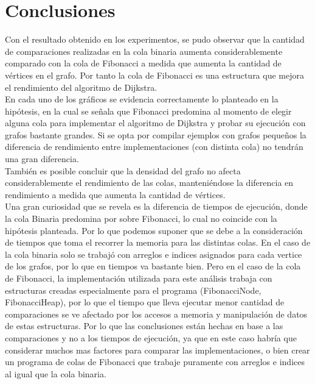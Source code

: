\documentclass[11pt]{article}
\begin{document}


\newpage
\section{Conclusiones}

Con el resultado obtenido en los experimentos, se pudo observar que la cantidad de comparaciones realizadas en la cola binaria aumenta considerablemente comparado con la cola de Fibonacci a medida que aumenta la cantidad de vértices en el grafo. Por tanto la cola de Fibonacci es una estructura que mejora el rendimiento del algoritmo de Dijkstra. \\

En cada uno de los gráficos se evidencia correctamente lo planteado en la hipótesis, en la cual se señala que Fibonacci predomina al momento de elegir alguna cola para implementar el algoritmo de Dijkstra y probar su ejecución con grafos bastante grandes. Si se opta por compilar ejemplos con grafos pequeños la diferencia de rendimiento entre implementaciones (con distinta cola) no tendrán una gran diferencia. \\

También es posible concluir que la densidad del grafo no afecta considerablemente el rendimiento de las colas, manteniéndose la diferencia en rendimiento a medida que aumenta la cantidad de vértices. \\

Una gran curiosidad que se revela es la diferencia de tiempos de ejecución, donde la cola Binaria predomina por sobre Fibonacci, lo cual no coincide con la hipótesis planteada. Por lo que podemos suponer que se debe a la consideración de tiempos que toma el recorrer la memoria para las distintas colas. En el caso de la cola binaria solo se trabajó con arreglos e indices asignados para cada vertice de los grafos, por lo que en tiempos va bastante bien. Pero en el caso de la cola de Fibonacci, la implementación utilizada para este análisis trabaja con estructuras creadas especialmente para el programa (FibonacciNode, FibonacciHeap), por lo que el tiempo que lleva ejecutar menor cantidad de comparaciones se ve afectado por los accesos a memoria y manipulación de datos de estas estructuras. Por lo que las conclusiones están hechas en base a las comparaciones y no a los tiempos de ejecución, ya que en este caso habría que considerar muchos mas factores para comparar las implementaciones, o bien crear un programa de colas de Fibonacci que trabaje puramente con arreglos e indices al igual que la cola binaria.
\end{document}

